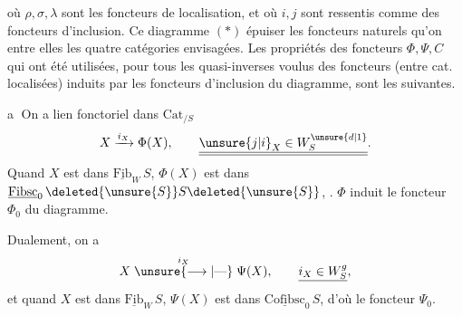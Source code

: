 où $\rho,\sigma,\lambda$ sont les foncteurs de localisation,
et où $i,j$ sont ressentis comme des
foncteurs d'inclusion. Ce diagramme $(*)$
 épuiser les foncteurs naturels qu'on 
 entre elles les quatre catégories envisagées.
Les propriétés des foncteurs $\Phi,\Psi,C$ qui ont été
utilisées, pour  tous les quasi-inverses
voulus des foncteurs (entre cat. localisées) induits par les foncteurs d'inclusion du diagramme, sont les suivantes.

\textcircled{a} On a  lien fonctoriel dans $\mathrm{Cat}_{/S}$
\[
X\xrightarrow{i_X}\Phi(X),\qquad \underline{\underline{\unsure{j|i}_X\in W_S^{\unsure{d|1}}}} .
\]
 Quand $X$ est dans $\underline{\mathrm{Fib}}_W\,S$,
$\Phi(X)$ est dans $\underline{\mathrm{Fibsc}}_0\,\deleted{\unsure{S}}S\deleted{\unsure{S}}$,
.
 $\Phi$ induit le foncteur $\Phi_0$ du diagramme.

Dualement, on a
\[
X\mathrel{\overset{i_X}{\unsure{\longrightarrow|\text{---}}}}\Psi(X),
\qquad\underline{i_X\in W_S^g},
\]
et quand $X$ est dans $\underline{\mathrm{Fib}}_W\,S$, $\Psi(X)$ est dans
$\underline{\mathrm{Cofibsc}}_0\,S$, d'où le foncteur $\Psi_0$.

